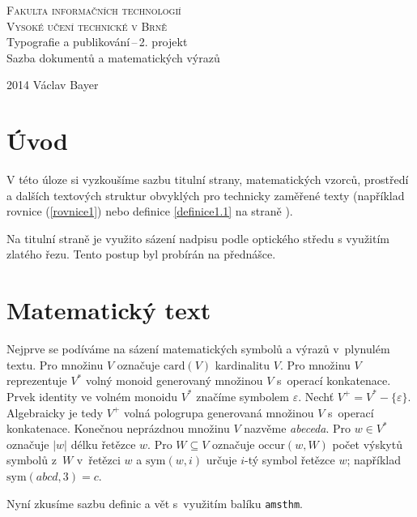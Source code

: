 \documentclass[a4paper,11pt,twocolumn]{article}[2014-03-27]
\begin{document}
\pagestyle{plain}

\begin{titlepage}
\begin{center}
    \Huge
    \textsc{Fakulta informačních technologií \\[-10pt]
        Vysoké učení technické v Brně}\\
        \LARGE {Typografie a publikování\,--\,2. projekt \\[-5pt]
        Sazba dokumentů a matematických výrazů}
\end{center}
{\Large 2014 \hfill Václav Bayer}
\end{titlepage}


\section*{Úvod}
V této úloze si vyzkoušíme sazbu titulní strany, matematických vzorců, prostředí a dalších textových struktur obvyklých pro technicky zaměřené texty (na\-příklad rovnice (\ref{rovnice1}) nebo definice \ref{definice1.1} na straně \pageref{definice1.1}).

Na titulní straně je využito sázení nadpisu podle optického středu s využitím zlatého řezu. Tento postup byl probírán na přednášce.


\section{Matematický text}
Nejprve se podíváme na sázení matematických symbolů a výrazů v~plynulém textu.
Pro množinu $V$ označuje $\mbox{card}(V)$ kardinalitu $V$.
Pro množinu $V$ reprezentuje $V^*$ volný monoid generovaný množinou $V$ s~operací konkatenace.
Prvek identity ve volném monoidu $V^*$ značíme symbolem $\varepsilon$.
Nechť $V^+ = V^* - \{\varepsilon\}$. Algebraicky je tedy $V^+$ volná pologrupa generovaná množinou $V$ s~operací konkatenace.
Konečnou neprázdnou množinu $V$ nazvěme \emph{abeceda}.
Pro $w \in V^*$ označuje $|w|$ délku řetězce $w$. Pro $W \subseteq V$ označuje $\mbox{occur}(w,W)$ počet výskytů symbolů z~$W$ v~řetězci $w$ a $\mbox{sym}(w,i)$ určuje $i$-tý symbol řetězce $w$; například $\mbox{sym}(abcd,3)=c$.

Nyní zkusíme sazbu definic a vět s~vy\-užitím balíku \texttt{amsthm}.

\theoremstyle{definition}
\newtheorem{definice}{Definice}[section]
\end{document}
